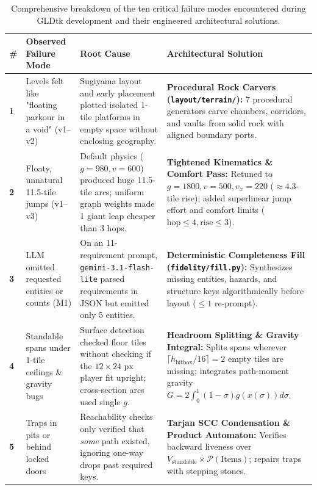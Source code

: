 \documentclass[11pt,a4paper]{report}
\theoremstyle{definition}
\theoremstyle{remark}
\begin{document}
\begin{table}[htbp]
\centering
\small
\caption{Comprehensive breakdown of the ten critical failure modes encountered during GLDtk development and their engineered architectural solutions.}
\label{tab:ten_issues}
\begin{tabularx}{\textwidth}{l p{3.2cm} p{4.2cm} X}
\toprule
\textbf{\#} & \textbf{Observed Failure Mode} & \textbf{Root Cause} & \textbf{Architectural Solution} \\
\midrule
\textbf{1} & Levels felt like "floating parkour in a void" (v1--v2) & Sugiyama layout and early placement plotted isolated 1-tile platforms in empty space without enclosing geography. & \textbf{Procedural Rock Carvers (\texttt{layout/terrain/}):} 7 procedural generators carve chambers, corridors, and vaults from solid rock with aligned boundary ports. \\
\addlinespace
\textbf{2} & Floaty, unnatural 11.5-tile jumps (v1--v3) & Default physics ($g=980, v=600$) produced huge 11.5-tile arcs; uniform graph weights made 1 giant leap cheaper than 3 hops. & \textbf{Tightened Kinematics \& Comfort Pass:} Retuned to $g=1800, v=500, v_x=220$ ($\approx 4.3$-tile rise); added superlinear jump effort and comfort limits ($\text{hop}\le 4, \text{rise}\le 3$). \\
\addlinespace
\textbf{3} & LLM omitted requested entities or counts (M1) & On an 11-requirement prompt, \texttt{gemini-3.1-flash-lite} parsed requirements in JSON but emitted only 5 entities. & \textbf{Deterministic Completeness Fill (\texttt{fidelity/fill.py}):} Synthesizes missing entities, hazards, and structure keys algorithmically before layout ($\le 1$ re-prompt). \\
\addlinespace
\textbf{4} & Standable spans under 1-tile ceilings \& gravity bugs & Surface detection checked floor tiles without checking if the $12\times 24\text{ px}$ player fit upright; cross-section arcs used single $g$. & \textbf{Headroom Splitting \& Gravity Integral:} Splits spans wherever $\lceil h_{\text{hitbox}}/16 \rceil = 2$ empty tiles are missing; integrates path-moment gravity $G = 2\int_0^1 (1-\sigma)g(x(\sigma))d\sigma$. \\
\addlinespace
\textbf{5} & Traps in pits or behind locked doors & Reachability checks only verified that \emph{some} path existed, ignoring one-way drops past required keys. & \textbf{Tarjan SCC Condensation \& Product Automaton:} Verifies backward liveness over $V_{\text{standable}} \times \mathcal{P}(\text{Items})$; repairs traps with stepping stones. \\

\end{tabularx}
\end{table}
\end{document}
